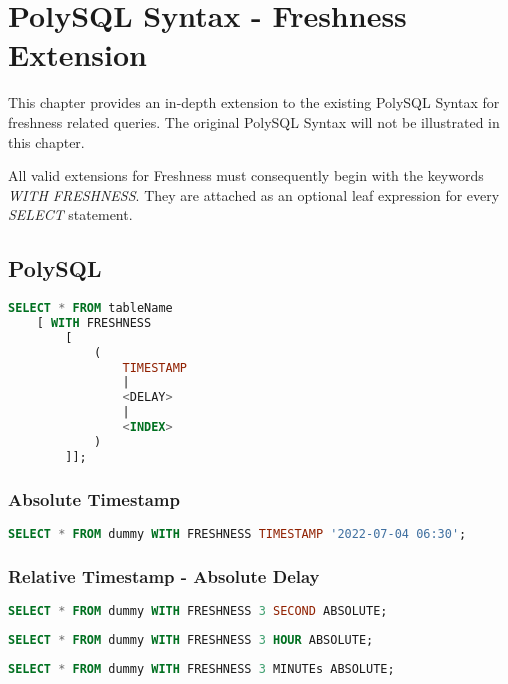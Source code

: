 \chapter{PolySQL Syntax - Freshness Extension}
This chapter provides an in-depth extension to the existing PolySQL Syntax for freshness related queries.
The original PolySQL Syntax will not be illustrated in this chapter.

All valid extensions for Freshness must consequently begin with the keywords \emph{WITH FRESHNESS}.
They are attached as an optional leaf expression for every \emph{SELECT} statement.

\tocless\section{PolySQL}


\begin{lstlisting}[language=sql]
    SELECT * FROM tableName 
    [ WITH FRESHNESS 
        [ 
            ( 
                TIMESTAMP 
                | 
                <DELAY> 
                | 
                <INDEX> 
            )   
        ]];
\end{lstlisting}

\tocless\subsection{Absolute Timestamp}

\begin{lstlisting}[language=sql]
    SELECT * FROM dummy WITH FRESHNESS TIMESTAMP '2022-07-04 06:30';
\end{lstlisting}


\tocless\subsection{Relative Timestamp - Absolute Delay}

\begin{lstlisting}[language=sql]
    SELECT * FROM dummy WITH FRESHNESS 3 SECOND ABSOLUTE;
\end{lstlisting}

\begin{lstlisting}[language=sql]
    SELECT * FROM dummy WITH FRESHNESS 3 HOUR ABSOLUTE;
\end{lstlisting}

\begin{lstlisting}[language=sql]
    SELECT * FROM dummy WITH FRESHNESS 3 MINUTEs ABSOLUTE;
\end{lstlisting}

